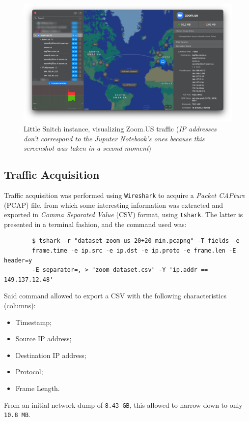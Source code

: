 \documentclass{article}
\begin{document}
\begin{figure}[h!]
	\centering
	\includegraphics[width=15cm]{assets/little-snitch.png}
	\caption{Little Snitch instance, visualizing Zoom.US traffic (\textit{IP addresses don't correspond to the Juputer Notebook's ones because this screenshot was taken in a second moment})}
	\label{fig::little-snitch}
\end{figure}

\subsection{Traffic Acquisition}

Traffic acquisition was performed using \texttt{Wireshark} to acquire a \textit{Packet CAPture} (PCAP) file, from which some interesting information was extracted and exported in \textit{Comma Separated Value} (CSV) format, using \texttt{tshark}. The latter is presented in a terminal fashion, and the command used was:

\begin{commandline}
	\begin{verbatim}
		$ tshark -r "dataset-zoom-us-20+20_min.pcapng" -T fields -e 
		frame.time -e ip.src -e ip.dst -e ip.proto -e frame.len -E header=y 
		-E separator=, > "zoom_dataset.csv" -Y 'ip.addr == 149.137.12.48'
	\end{verbatim}
\end{commandline}
Said command allowed to export a CSV with the following characteristics (columns):

\begin{itemize}
	\item Timestamp;
	\item Source IP address;
	\item Destination IP address;
	\item Protocol;
	\item Frame Length.
\end{itemize}
From an initial network dump of \texttt{8.43 GB}, this allowed to narrow down to only \texttt{10.8 MB}.
\end{document}
